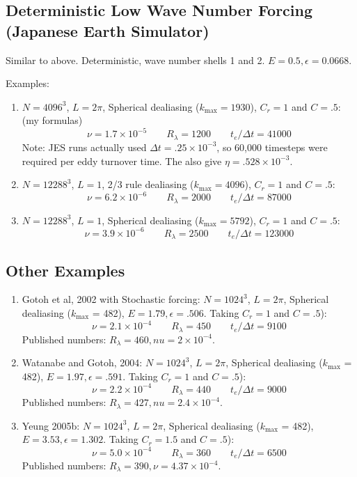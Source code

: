 \documentclass[12pt]{article}
\begin{document}
\subsection{Deterministic Low Wave Number Forcing (Japanese Earth Simulator)}

Similar to above.  Deterministic, wave number shells 1 and 2.
$E=0.5, \epsilon=0.0668$.  

Examples:
\begin{enumerate}
\item $N=4096^3$, $L=2\pi$, Spherical dealiasing ($k_\text{max} = 1930$),
$C_r=1$ and $C=.5$:  (my formulas)
\[
\nu = 1.7 \times 10^{-5} \qquad  R_\lambda =  1200\qquad t_e / \Delta t = 41000
\]
Note: JES runs actually used $\Delta t = .25 \times 10^{-3}$, so 60,000
timesteps were required per eddy turnover time.  The also give $\eta=.528\times10^{-3}$.


\item $N=12288^3$, $L=1$, 2/3 rule dealiasing ($k_\text{max} = 4096$), 
$C_r=1$ and $C=.5$:  
\[
\nu = 6.2 \times 10^{-6} \qquad  R_\lambda =  2000\qquad t_e/\Delta t = 87000
\]

\item $N=12288^3$, $L=1$, Spherical dealiasing ($k_\text{max} = 5792$), 
$C_r=1$ and $C=.5$:  
\[
\nu = 3.9 \times 10^{-6} \qquad  R_\lambda =  2500 \qquad t_e / \Delta t  = 123000
\]



\end{enumerate}



\subsection{Other Examples}


\begin{enumerate}
\item Gotoh et al, 2002 with Stochastic forcing:  $N=1024^3$, $L=2\pi$, Spherical dealiasing 
($k_\text{max}$ = 482), $E=1.79, \epsilon=.506$.  Taking $C_r=1$ and $C=.5$): 
\[
\nu = 2.1 \times 10^{-4} \qquad  R_\lambda =  450\qquad t_e / \Delta t = 9100
\]
Published numbers:  $R_\lambda=460, nu=2 \times 10^{-4}$.

\item Watanabe and Gotoh, 2004:  $N=1024^3$, $L=2\pi$, Spherical dealiasing 
($k_\text{max}$ = 482), $E=1.97, \epsilon=.591$.  Taking $C_r=1$ and $C=.5$): 
\[
\nu = 2.2 \times 10^{-4} \qquad  R_\lambda =  440\qquad t_e / \Delta t = 9000
\]
Published numbers:  $R_\lambda=427, nu=2.4 \times 10^{-4}$.

\item Yeung 2005b:  $N=1024^3$, $L=2\pi$, Spherical dealiasing 
($k_\text{max}$ = 482), $E=3.53, \epsilon=1.302$.  Taking $C_r=1.5$ and $C=.5$): 
\[
\nu = 5.0 \times 10^{-4} \qquad  R_\lambda =  360\qquad t_e / \Delta t = 6500
\]
Published numbers:  $R_\lambda=390, \nu=4.37 \times 10^{-4}$.




\end{enumerate}
\end{document}
